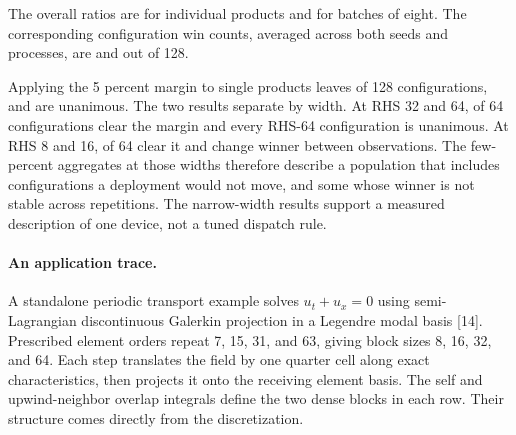 \begin{table}[!htbp]
\centering\small
\caption{Repeated MAGMA-inclusive comparisons. Each width and batch contains
32 configurations, three seeds, and three processes per seed. Ratios above
one favor direct. Wins count 96 configuration and seed combinations. The last
three columns count individual configurations out of 32: wins with a
geometric mean above 1.05, configurations where all nine observations favor
direct, and configurations whose winner changes between observations.}
\label{tab:magma-repeatability}

\end{table}

The overall ratios are \RelevanceCoreRatio{} for individual products and
\RelevanceQueuedRatio{} for batches of eight. The corresponding configuration
win counts, averaged across both seeds and processes, are
\RelevanceCoreWins{} and \RelevanceQueuedWins{} out of 128.

Applying the 5 percent margin to single products leaves
\RelevanceMarginWins{} of 128 configurations, and \RelevanceUnanimous{} are
unanimous. The two results separate by width. At RHS 32 and 64,
\RelevanceWideMarginWins{} of 64 configurations clear the margin and every
RHS-64 configuration is unanimous. At RHS 8 and 16, \RelevanceNarrowMarginWins{}
of 64 clear it and \RelevanceNarrowSplit{} change winner between observations.
The few-percent aggregates at those widths therefore describe a population
that includes configurations a deployment would not move, and some whose
winner is not stable across repetitions. The narrow-width results support a
measured description of one device, not a tuned dispatch rule.

\paragraph{An application trace.}
A standalone periodic transport example solves \(u_t+u_x=0\) using
semi-Lagrangian discontinuous Galerkin projection in a Legendre modal basis [14].
Prescribed element orders repeat 7, 15, 31, and 63, giving block sizes
8, 16, 32, and 64. Each step translates the field by one quarter cell along
exact characteristics, then projects it onto the receiving element basis.
The self and upwind-neighbor overlap integrals define the two dense blocks
in each row. Their structure comes directly from the discretization.

